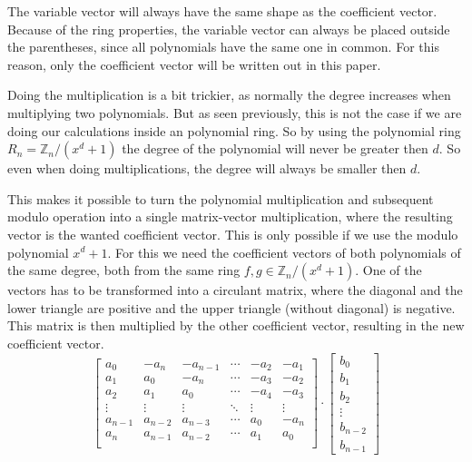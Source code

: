The variable vector will always have the same shape as the coefficient vector. Because of the ring properties, the variable vector can always be placed outside the parentheses, since all polynomials have the same one in common. For this reason, only the coefficient vector will be written out in this paper.

Doing the multiplication is a bit trickier, as normally the degree increases when multiplying two polynomials. But as seen previously, this is not the case if we are doing our calculations inside an polynomial ring. So by using the polynomial ring $R_n = \mathbb{Z}_n/(x^d+1)$ the degree of the polynomial will never be greater then $d$. So even when doing multiplications, the degree will always be smaller then $d$.

This makes it possible to turn the polynomial multiplication and subsequent modulo operation into a single matrix-vector multiplication, where the resulting vector is the wanted coefficient vector. This is only possible if we use the modulo polynomial $x^d+1$. For this we need the coefficient vectors of both polynomials of the same degree, both from the same ring $f, g \in \mathbb{Z}_n/(x^d+1)$. One of the vectors has to be transformed into a circulant matrix, where the diagonal and the lower triangle are positive and the upper triangle (without diagonal) is negative. This matrix is then multiplied by the other coefficient vector, resulting in the new coefficient vector.
$$
  \begin{bmatrix}
    a_0     & -a_{n}  & -a_{n-1} & \cdots & -a_2   & -a_1   \\
    a_1     & a_0     & -a_{n}   & \cdots & -a_3   & -a_2   \\
    a_2     & a_1     & a_0      & \cdots & -a_4   & -a_3   \\
    \vdots  & \vdots  & \vdots   & \ddots & \vdots & \vdots \\
    a_{n-1} & a_{n-2} & a_{n-3}  & \cdots & a_0    & -a_{n} \\
    a_{n}   & a_{n-1} & a_{n-2}  & \cdots & a_1    & a_0    \\
  \end{bmatrix}
  \cdot
  \begin{bmatrix}
    b_0     \\
    b_1     \\
    b_2     \\
    \vdots  \\
    b_{n-2} \\
    b_{n-1}
  \end{bmatrix}
$$

